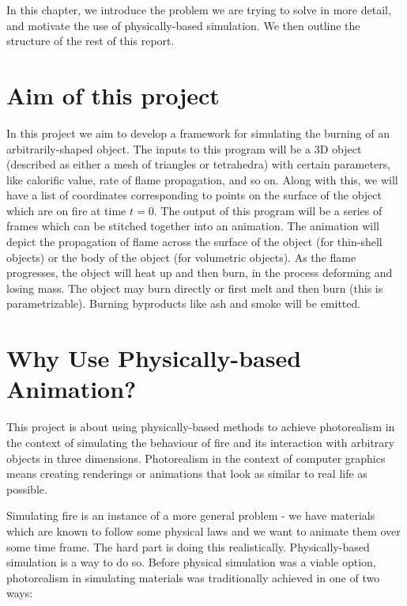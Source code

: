 \documentclass[12pt]{report}
\begin{document}
In this chapter, we introduce the problem we are trying to solve in more detail, and motivate the use of physically-based simulation. We then outline the structure of the rest of this report.

\section{Aim of this project} %

In this project we aim to develop a framework for simulating the burning of an arbitrarily-shaped object. The inputs to this program will be a 3D object (described as either a mesh of triangles or tetrahedra) with certain parameters, like calorific value, rate of flame propagation, and so on. Along with this, we will have a list of coordinates corresponding to points on the surface of the object which are on fire at time $t = 0$. The output of this program will be a series of frames which can be stitched together into an animation. The animation will depict the propagation of flame across the surface of the object (for thin-shell objects) or the body of the object (for volumetric objects). As the flame progresses, the object will heat up and then burn, in the process deforming and losing mass. The object may burn directly or first melt and then burn (this is parametrizable). Burning byproducts like ash and smoke will be emitted.

\section{Why Use Physically-based Animation?} %
\label{sec:phys_based_animation}

This project is about using physically-based methods to achieve photorealism in the context of simulating the behaviour of fire and its interaction with arbitrary objects in three dimensions. Photorealism in the context of computer graphics means creating renderings or animations that look as similar to real life as possible.

Simulating fire is an instance of a more general problem - we have materials which are known to follow some physical laws and we want to animate them over some time frame. The hard part is doing this realistically. Physically-based simulation is a way to do so. Before physical simulation was a viable option, photorealism in simulating materials was traditionally achieved in one of two ways:
\end{document}
